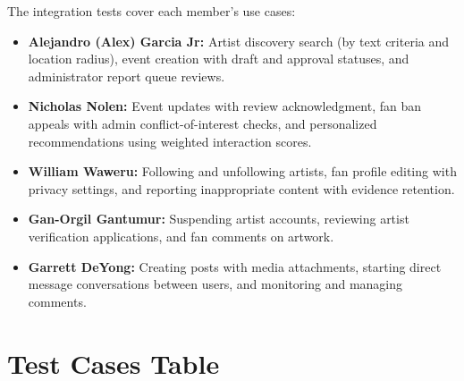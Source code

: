\documentclass[11pt]{report}
\begin{document}
The integration tests cover each member's use cases:
\begin{itemize}
  \item \textbf{Alejandro (Alex) Garcia Jr:} Artist discovery search (by text criteria and location radius), event creation with draft and approval statuses, and administrator report queue reviews.
  \item \textbf{Nicholas Nolen:} Event updates with review acknowledgment, fan ban appeals with admin conflict-of-interest checks, and personalized recommendations using weighted interaction scores.
  \item \textbf{William Waweru:} Following and unfollowing artists, fan profile editing with privacy settings, and reporting inappropriate content with evidence retention.
  \item \textbf{Gan-Orgil Gantumur:} Suspending artist accounts, reviewing artist verification applications, and fan comments on artwork.
  \item \textbf{Garrett DeYong:} Creating posts with media attachments, starting direct message conversations between users, and monitoring and managing comments.
\end{itemize}

\section{Test Cases Table}

\newcommand{\alextestcase}[6]{%
\par\medskip\noindent\begin{minipage}{\textwidth}
\small\renewcommand{\arraystretch}{1.18}%
\begin{tabular}{|>{\raggedright\arraybackslash}p{0.23\textwidth}|>{\raggedright\arraybackslash}p{\dimexpr0.77\textwidth-4\tabcolsep-3\arrayrulewidth\relax}|}
\hline
\textbf{Test Case ID \#} & \textbf{#1} \\ \hline
\textbf{Assigned Tester} & Alejandro (Alex) Garcia Jr \\ \hline
\textbf{Scenario/Condition} & #2 \\ \hline
\textbf{Test Inputs} & #3 \\ \hline
\textbf{Expected Result} & #4 \\ \hline
\textbf{Actual Result} & #5 \\ \hline
\textbf{Test Status} & #6 \\ \hline
\end{tabular}
\end{minipage}\par\medskip
}
\end{document}
